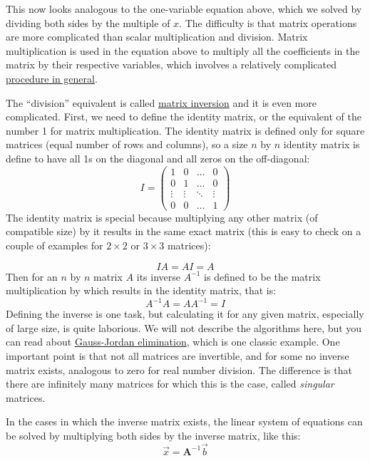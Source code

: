 \documentclass[
  letterpaper,
  DIV=11,
  numbers=noendperiod]{scrreprt}
\begin{document}
This now looks analogous to the one-variable equation above, which we
solved by dividing both sides by the multiple of \(x\). The difficulty
is that matrix operations are more complicated than scalar
multiplication and division. Matrix multiplication is used in the
equation above to multiply all the coefficients in the matrix by their
respective variables, which involves a relatively complicated
\href{https://en.wikipedia.org/wiki/Matrix_multiplication}{procedure in
general}.

The ``division'' equivalent is called
\href{https://en.wikipedia.org/wiki/Invertible_matrix}{matrix inversion}
and it is even more complicated. First, we need to define the identity
matrix, or the equivalent of the number 1 for matrix multiplication. The
identity matrix is defined only for square matrices (equal number of
rows and columns), so a size \(n\) by \(n\) identity matrix is define to
have all 1s on the diagonal and all zeros on the off-diagonal: \[
I = \begin{pmatrix} 1 & 0 & \dots & 0 \\ 0 & 1  &\dots & 0 \\ \vdots & \vdots & \ddots & \vdots \\ 0 & 0 &\dots & 1\end{pmatrix}
\] The identity matrix is special because multiplying any other matrix
(of compatible size) by it results in the same exact matrix (this is
easy to check on a couple of examples for \(2 \times 2\) or
\(3 \times 3\) matrices):

\[
I A = A I = A
\] Then for an \(n\) by \(n\) matrix \(A\) its inverse \(A^{-1}\) is
defined to be the matrix multiplication by which results in the identity
matrix, that is: \[
A^{-1} A = A A^{-1}  = I
\] Defining the inverse is one task, but calculating it for any given
matrix, especially of large size, is quite laborious. We will not
describe the algorithms here, but you can read about
\href{https://en.wikipedia.org/wiki/Gaussian_elimination\#Finding_the_inverse_of_a_matrix}{Gauss-Jordan
elimination}, which is one classic example. One important point is that
not all matrices are invertible, and for some no inverse matrix exists,
analogous to zero for real number division. The difference is that there
are infinitely many matrices for which this is the case, called
\emph{singular} matrices.

In the cases in which the inverse matrix exists, the linear system of
equations can be solved by multiplying both sides by the inverse matrix,
like this: \[
 \vec x = \mathbf{A}^{-1}\vec b
\]
\end{document}
